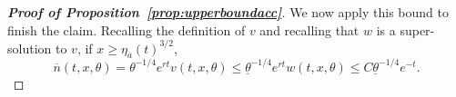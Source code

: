 \documentclass[11pt]{article}    %
\newtheorem{remark}[theorem]{Remark}
\begin{document}
\begin{proof}[{\bf Proof of Proposition~\ref{prop:upperboundacc}}]
We now apply this bound to finish the claim.  Recalling the definition of $v$ and recalling that $w$ is a super-solution to $v$, if $x \geq \eta_{\overline a}(t)^{3/2}$,
\[
	\overline n(t,x,\theta)
		= \theta^{-1/4} e^{rt} v(t,x,\theta)
		\leq \underline\theta^{-1/4} e^{rt} w(t,x,\theta)
		\leq C \underline\theta^{-1/4}e^{-t}.
\]
\end{proof}




%
%
\end{document}
